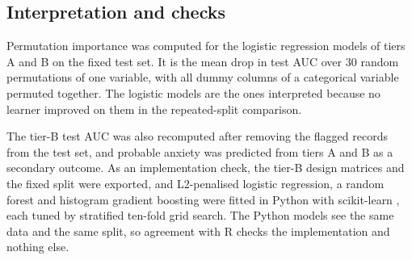 \subsection{Interpretation and checks}
Permutation importance was computed for the logistic regression models of tiers A and B on the fixed test set. It is the mean drop in test AUC over 30 random permutations of one variable, with all dummy columns of a categorical variable permuted together. The logistic models are the ones interpreted because no learner improved on them in the repeated-split comparison.

The tier-B test AUC was also recomputed after removing the flagged records from the test set, and probable anxiety was predicted from tiers A and B as a secondary outcome. As an implementation check, the tier-B design matrices and the fixed split were exported, and L2-penalised logistic regression, a random forest and histogram gradient boosting were fitted in Python with scikit-learn \parencite{pedregosa2011}, each tuned by stratified ten-fold grid search. The Python models see the same data and the same split, so agreement with R checks the implementation and nothing else.
